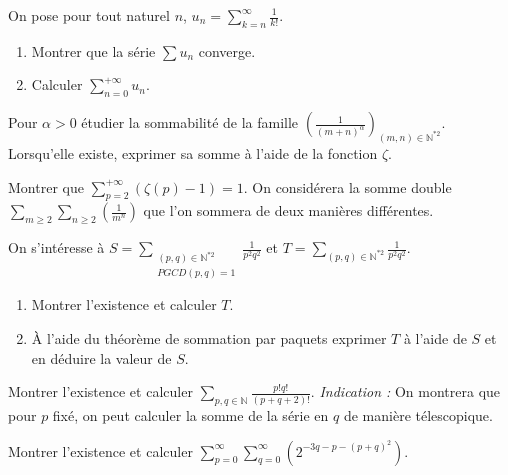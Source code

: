 \begin{exercice}
On pose pour tout naturel $n$, $u_{n}=\sum_{k=n}^{\infty}\frac{1}{k!}$.
\begin{enumerate}
    \item Montrer que la série $\sum u_{n}$ converge.
    \item Calculer $\sum_{n=0}^{+\infty}u_{n}$.
\end{enumerate}
\end{exercice}

\begin{exercice}
Pour $\alpha>0$ étudier la sommabilité de la famille $(\frac{1}{(m+n)^{\alpha}})_{(m,n)\in \mathbb{N}^{*2}}$.
Lorsqu'elle existe, exprimer sa somme à l'aide de la fonction $\zeta$.
\end{exercice}

\begin{exercice}
Montrer que $\sum_{p=2}^{+\infty}(\zeta(p)-1)=1$.
On considérera la somme double $\sum_{m\ge2}\sum_{n\ge2}(\frac{1}{m^{n}})$ que l'on sommera de deux manières différentes.
\end{exercice}

\begin{exercice}
On s'intéresse à $S=\sum_{\substack{(p,q)\in\mathbb{N}^{*2} \\ PGCD(p,q)=1}}\frac{1}{p^{2}q^{2}}$ et $T=\sum_{(p,q)\in\mathbb{N}^{*2}}\frac{1}{p^{2}q^{2}}$.
\begin{enumerate}
    \item Montrer l'existence et calculer $T$.
    \item À l'aide du théorème de sommation par paquets exprimer $T$ à l'aide de $S$ et en déduire la valeur de $S$.
\end{enumerate}
\end{exercice}

\begin{exercice}
Montrer l'existence et calculer $\sum_{p,q\in \mathbb{N}}\frac{p!q!}{(p+q+2)!}$.
\textit{Indication :} On montrera que pour $p$ fixé, on peut calculer la somme de la série en $q$ de manière télescopique.
\end{exercice}

\begin{exercice}
Montrer l'existence et calculer $\sum_{p=0}^{\infty}\sum_{q=0}^{\infty}(2^{-3q-p-(p+q)^{2}})$.
\end{exercice}

